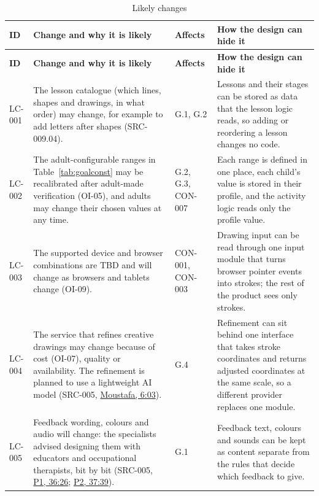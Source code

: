 \documentclass[12pt]{article}
\renewcommand{\_}{\textunderscore\allowbreak}%
\newcommand{\intlink}[3]{\hyperref[int:#1-#2]{#3}}
\newcommand{\intref}[2]{\intlink{#1}{#2}{#1, #2}}
\begin{document}
{\small
\begin{longtable}{@{}>{\raggedright\arraybackslash}p{}%
>{\raggedright\arraybackslash}p{}%
>{\raggedright\arraybackslash}p{}%
>{\raggedright\arraybackslash}p{}@{}} \caption{Likely
changes}\label{tab:likelyChanges}\\
\toprule
\textbf{ID} & \textbf{Change and why it is likely} & \textbf{Affects} &
\textbf{How the design can hide it} \\
\midrule
\endfirsthead
\toprule
\textbf{ID} & \textbf{Change and why it is likely} & \textbf{Affects} &
\textbf{How the design can hide it} \\
\midrule
\endhead
\bottomrule
\endlastfoot
LC-001 & The lesson catalogue (which lines, shapes and drawings, in what order)
may change, for example to add letters after shapes (SRC-009.04). & G.1, G.2 &
Lessons and their stages can be stored as data that the lesson logic reads, so
adding or reordering a lesson changes no code. \\
\addlinespace
LC-002 & The adult-configurable ranges in Table~\ref{tab:goalconst} may be
recalibrated after adult-made verification (OI-05), and adults may change their
chosen values at any time. & G.2, G.3, CON-007 & Each range is defined in one
place, each child's value is stored in their profile, and the activity logic
reads only the profile value. \\
\addlinespace
LC-003 & The supported device and browser combinations are TBD and will change
as browsers and tablets change (OI-09). & CON-001, CON-003 & Drawing input can
be read through one input module that turns browser pointer events into strokes;
the rest of the product sees only strokes. \\
\addlinespace
LC-004 & The service that refines creative drawings may change because of cost
(OI-07), quality or availability. The refinement is planned to use a lightweight
AI model (SRC-005, \intref{Moustafa}{6:03}). & G.4 & Refinement can sit behind
one interface that takes stroke coordinates and returns adjusted coordinates at
the same scale, so a different provider replaces one module. \\
\addlinespace
LC-005 & Feedback wording, colours and audio will change: the specialists
advised designing them with educators and occupational therapists, bit by bit
(SRC-005, \intref{P1}{36:26}; \intref{P2}{37:39}). & G.1 & Feedback text,
colours and sounds can be kept as content separate from the rules that decide
which feedback to give. \\

\end{longtable}}
\end{document}
